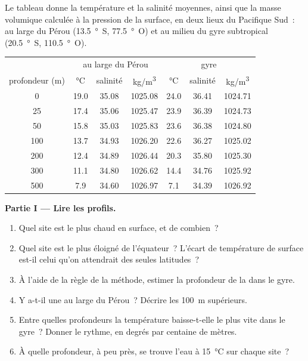 \begin{problem}
\label{pb:g10:layered-ocean:1}
Le tableau donne la température et la salinité moyennes, ainsi que la masse
volumique calculée à la pression de la surface, en deux lieux du Pacifique
Sud~: au large du Pérou (\qty{13.5}{\degree S}, \qty{77.5}{\degree O}) et au
milieu du gyre subtropical (\qty{20.5}{\degree S}, \qty{110.5}{\degree O}).

\begin{center}
\small
\begin{tabular}{c|ccc|ccc}
\hline
 & \multicolumn{3}{c|}{au large du Pérou} & \multicolumn{3}{c}{gyre} \\
profondeur (\unit{m}) & \unit{\degreeCelsius} & salinité & \unit{kg/m^3} & \unit{\degreeCelsius} & salinité & \unit{kg/m^3} \\
\hline
0 & 19.0 & 35.08 & 1025.08 & 24.0 & 36.41 & 1024.71 \\
25 & 17.4 & 35.06 & 1025.47 & 23.9 & 36.39 & 1024.73 \\
50 & 15.8 & 35.03 & 1025.83 & 23.6 & 36.38 & 1024.80 \\
100 & 13.7 & 34.93 & 1026.20 & 22.6 & 36.27 & 1025.02 \\
200 & 12.4 & 34.89 & 1026.44 & 20.3 & 35.80 & 1025.30 \\
300 & 11.1 & 34.80 & 1026.62 & 14.4 & 34.76 & 1025.92 \\
500 & 7.9 & 34.60 & 1026.97 & 7.1 & 34.39 & 1026.92 \\
\hline
\end{tabular}
\end{center}

\medskip
\noindent\textbf{Partie I --- Lire les profils.}
\begin{enumerate}
  \item Quel site est le plus chaud en surface, et de combien~?
  \item Quel site est le plus éloigné de l'équateur~? L'écart de
        température de surface est-il celui qu'on attendrait des seules
        latitudes~?
  \item À l'aide de la règle de la méthode, estimer la profondeur de la
         dans le gyre.
  \item Y a-t-il une  au large du Pérou~? Décrire les
        \qty{100}{m} supérieurs.
  \item Entre quelles profondeurs la température baisse-t-elle le plus vite
        dans le gyre~? Donner le rythme, en degrés par centaine de mètres.
  \item À quelle profondeur, à peu près, se trouve l'eau à
        \qty{15}{\degreeCelsius} sur chaque site~?
\end{enumerate}


\end{problem}

